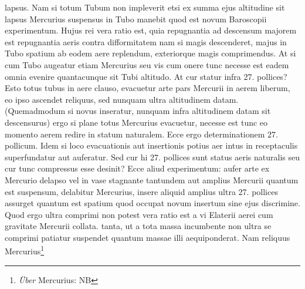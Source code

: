lapsus. Nam si totum Tubum  non impleverit etsi ex summa ejus altitudine sit lapsus Mercurius\protect{}  suspensus in Tubo manebit quod est novum Baroscopii\protect{}  experimentum. Hujus rei vera ratio est, quia repugnantia ad  descensum majorem est repugnantia aeris contra difformitatem  nam si magis descenderet, majus in Tubo spatium ab eodem aere  replendum, exteriorque magis comprimendus. At si cum Tubo augeatur  etiam Mercurius\protect{} seu vis cum onere\protect{} tunc necesse est eadem omnia evenire  quantacunque sit Tubi altitudo. At cur statur infra 27. pollices? Esto totus tubus\protect{}  in aere clauso, evacuetur arte pars Mercurii\protect{} in aerem liberum, eo  ipso ascendet reliquus, sed nunquam ultra altitudinem datam. (Quemadmodum si novus  inseratur, nunquam infra altitudinem datam sit descensurus) ergo si plane totus Mercurius\protect{} evacuetur, necesse est tunc eo momento aerem redire in statum naturalem. Ecce ergo determinationem 27. pollicum. Idem si loco evacuationis aut insertionis potius aer intus in receptaculis superfundatur aut auferatur. Sed cur hi  27. pollices sunt status aeris naturalis seu cur tunc compressus esse  desinit? Ecce aliud experimentum: aufer arte ex Mercurio\protect{} delapso vel  in vase stagnante tantundem aut amplius Mercurii\protect{} quantum est suspensum, delabitur Mercurius\protect{}, insere aliquid amplius ultra 27. pollices  assurget quantum est spatium quod occupat novum insertum sine  ejus discrimine. Quod ergo ultra comprimi non potest vera  ratio est a vi Elaterii\protect{} aerei cum gravitate\protect{} Mercurii\protect{}  collata.  tanta, ut a tota massa\protect{} incumbente non ultra se comprimi  patiatur suspendet quantum massae\protect{} illi aequiponderat. Nam reliquus Mercurius\protect{}\footnote{\textit{\"{U}ber} Mercurius: NB}
